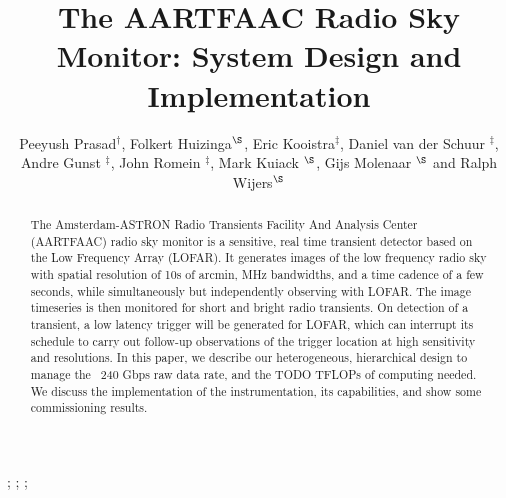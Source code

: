 \documentclass{ws-jai}
\begin{document}
\catchline{}{}{}{}{} %


\title{The AARTFAAC Radio Sky Monitor: System Design and Implementation}

\author{Peeyush Prasad$^\dagger$, Folkert Huizinga$^\S$, Eric Kooistra$^\ddagger$, Daniel van der Schuur $^\ddagger$, Andre Gunst $^\ddagger$, John Romein $^\ddagger$, Mark Kuiack $^\S$, Gijs Molenaar $^\S$ and Ralph Wijers$^\S$}

\address{
$^\dagger$Anton Pannekoek Institute, University of Amsterdam, Amsterdam, The Netherlands, p.prasad@uva.nl\\
$^\ddagger$ASTRON, Oude Hoogeveensedijk, 7991PD, The Netherlands\\
$^\S$Anton Pannekoek Institute, University of Amsterdam, Amsterdam\\
}

\maketitle


\begin{history}
;
;
;
\end{history}

\begin{abstract}
The Amsterdam-ASTRON  Radio Transients  Facility And Analysis  Center (AARTFAAC)
radio sky monitor is a sensitive, real  time transient detector based on the Low
Frequency Array  (LOFAR).  It generates  images of  the low frequency  radio sky
with spatial resolution of 10s of arcmin,  MHz bandwidths, and a time cadence of
a few seconds, while simultaneously but independently observing with LOFAR.  The
image timeseries  is then monitored  for short  and bright radio  transients. On
detection of  a transient, a  low latency trigger  will be generated  for LOFAR,
which can  interrupt its  schedule to  carry out  follow-up observations  of the
trigger  location  at high  sensitivity  and  resolutions.   In this  paper,  we
describe our heterogeneous, hierarchical design to manage the ~240 Gbps raw data
rate, and the TODO TFLOPs of computing needed.  We discuss the implementation of
the instrumentation, its capabilities, and show some commissioning results.
\end{abstract}
\end{document}
